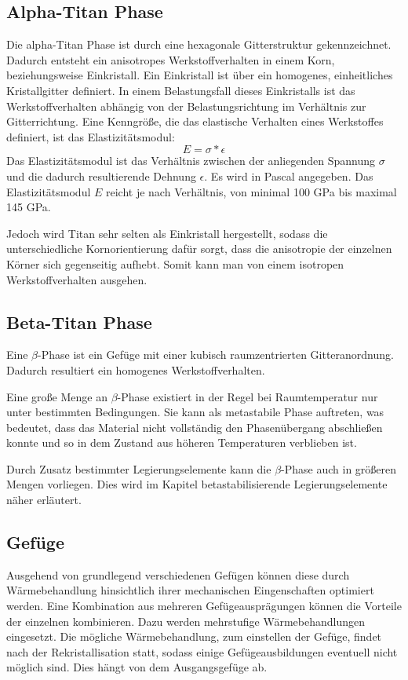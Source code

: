 \documentclass[a4paper, 11pt]{tubsreprt}
\begin{document}
\subsection{Alpha-Titan Phase}
Die alpha-Titan Phase ist durch eine hexagonale Gitterstruktur gekennzeichnet. Dadurch entsteht ein anisotropes Werkstoffverhalten in einem Korn, beziehungsweise Einkristall.
Ein Einkristall ist über ein homogenes, einheitliches Kristallgitter definiert.
In einem Belastungsfall dieses Einkristalls ist das Werkstoffverhalten abhängig von der Belastungsrichtung im Verhältnis zur Gitterrichtung. Eine Kenngröße, die das elastische Verhalten eines Werkstoffes definiert, ist das Elastizitätsmodul: 
\begin{equation}
E=\sigma*\epsilon
\end{equation}
Das Elastizitätsmodul ist das Verhältnis zwischen der anliegenden Spannung $\sigma$ und die dadurch resultierende Dehnung $\epsilon$.
Es wird in Pascal angegeben. Das Elastizitätsmodul $E$ reicht je nach Verhältnis, von minimal 100 GPa bis maximal 145 GPa. 

Jedoch wird Titan sehr selten als Einkristall hergestellt, sodass die unterschiedliche Kornorientierung dafür sorgt, dass die anisotropie der einzelnen Körner sich gegenseitig aufhebt. Somit kann man von einem isotropen Werkstoffverhalten ausgehen.

\subsection{Beta-Titan Phase}
Eine $\beta$-Phase ist ein Gefüge mit einer kubisch raumzentrierten Gitteranordnung. Dadurch resultiert ein homogenes Werkstoffverhalten.

Eine große Menge an $\beta$-Phase existiert in der Regel bei Raumtemperatur nur unter bestimmten Bedingungen. Sie kann als metastabile Phase auftreten, was bedeutet, dass das Material nicht vollständig den Phasenübergang abschließen konnte und so in dem Zustand aus höheren Temperaturen verblieben ist.  

Durch Zusatz bestimmter Legierungselemente kann die $\beta$-Phase auch in größeren Mengen vorliegen. Dies wird im Kapitel betastabilisierende Legierungselemente näher erläutert.
\subsection{Gefüge}
Ausgehend von grundlegend verschiedenen Gefügen können diese durch Wärmebehandlung hinsichtlich ihrer mechanischen Eingenschaften optimiert werden. Eine Kombination aus mehreren Gefügeausprägungen können die Vorteile der einzelnen kombinieren. Dazu werden mehrstufige Wärmebehandlungen eingesetzt. Die mögliche Wärmebehandlung, zum einstellen der Gefüge, findet nach der Rekristallisation statt, sodass einige Gefügeausbildungen eventuell nicht möglich sind. Dies hängt von dem Ausgangsgefüge ab.
\end{document}
